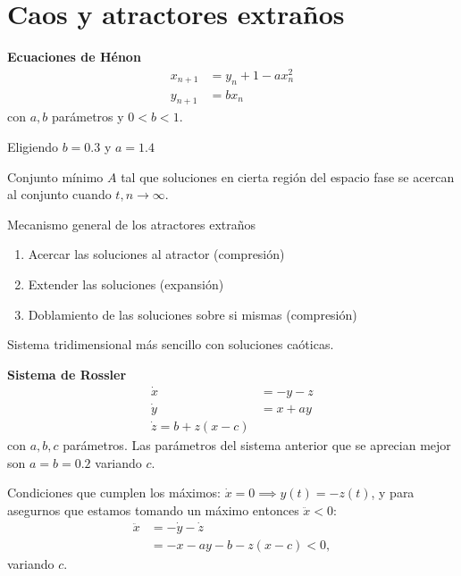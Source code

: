 \section{Caos y atractores extraños}

\begin{comment}
	Cuando tenemos un atractor extraño tenemos caos.
	
\end{comment}

\textbf{Ecuaciones de Hénon}
\begin{align*}
  x_{n+1} &= y_n+1-ax_{n}^2 \\
	y_{n+1}&= bx_n
\end{align*}
con $a,b$ parámetros y $0<b<1$.

Eligiendo $b=0.3$ y $a=1.4$ 

\begin{tcolorbox}[colback=Black!4, colframe=White,arc=2mm]
\begin{definicion}[Atractor]
	Conjunto mínimo $A$ tal que soluciones en cierta región del espacio fase se acercan al conjunto cuando $t,n \to \infty$. 
\end{definicion}
\end{tcolorbox}

Mecanismo general de los atractores extraños
\begin{enumerate}
	\item Acercar las soluciones al atractor (compresión)
	\item Extender las soluciones (expansión)
	\item Doblamiento de las soluciones sobre si mismas (compresión)
\end{enumerate}

Sistema tridimensional más sencillo con soluciones caóticas.

\textbf{Sistema de Rossler}
\begin{align*}
  \dot{x} &= -y-z \\
	\dot{y} &= x+ay \\
	\dot{z}= b+z(x-c)
\end{align*}
con $a,b,c$ parámetros. Las parámetros del sistema anterior que se aprecian mejor son  $a=b=0.2$ variando  $c$.
 
Condiciones que cumplen los máximos: $\dot{x}=0 \implies y(t)=-z(t)$, y para asegurnos que estamos tomando un máximo entonces $\ddot{x} <0$:
\begin{align*}
  \ddot{x} &= -\dot{y} - \dot{z} \\
					 &= -x-ay-b-z(x-c)<0,
\end{align*}
variando $c$.

